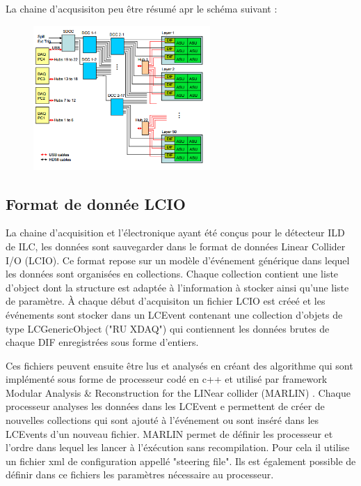 La chaine d'acqusisiton peu être résumé apr le schéma suivant : 
\begin{figure}[ht!]
	\centering
	\includegraphics[width=0.6\textwidth]{GLA/chaine.png}
\end{figure}

\subsection{Format de donnée LCIO}
La chaine d'acquisition et l'électronique ayant été conçus pour le détecteur ILD de ILC, les données sont sauvegarder dans le format de données Linear Collider I/O (LCIO)\cite{2003physics6114G}. Ce format repose sur un modèle d'événement générique  dans lequel les données sont organisées en collections. Chaque collection contient une liste d'object dont la structure est adaptée à l'information à stocker ainsi qu'une liste de paramètre. À chaque début d'acquisiton un fichier LCIO est créeé et les événements sont stocker dans un LCEvent contenant une collection d'objets de type LCGenericObject ("RU XDAQ") qui contiennent les données brutes de chaque DIF enregistrées sous forme d'entiers.

Ces fichiers peuvent ensuite être lus et analysés en créant des algorithme qui sont implémenté sous forme de processeur codé en c++ et utilisé par framework Modular Analysis \& Reconstruction for the LINear collider (MARLIN) \cite{Gaede:2006pj}. Chaque processeur analyses les données dans les LCEvent e permettent de créer de nouvelles collections qui sont ajouté à l'événement ou sont inséré dans les LCEvents d'un nouveau fichier. MARLIN permet de définir les processeur et l'ordre dans lequel les lancer à l'éxécution sans recompilation. Pour cela il utilise un fichier xml de configuration appellé "steering file". Ils est également possible de définir dans ce fichiers les paramètres nécessaire au processeur.

